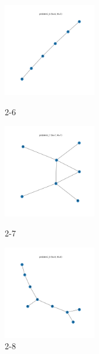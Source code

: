 \documentclass[a4paper, 10pt, dvipdfmx]{jlreq}
\begin{document}
\begin{figure}[htbp]
  \begin{minipage}{0.33\hsize}
    \begin{center}
      \includegraphics[width=40mm]{img_5/problem2_6.png}
    \end{center}
    \caption{2-6}
  \end{minipage}
  \begin{minipage}{0.33\hsize}
    \begin{center}
      \includegraphics[width=40mm]{img_5/problem2_7.png}
    \end{center}
    \caption{2-7}
  \end{minipage}
  \begin{minipage}{0.33\hsize}
    \begin{center}
      \includegraphics[width=40mm]{img_5/problem2_8.png}
    \end{center}
    \caption{2-8}
  \end{minipage}
\end{figure}
\end{document}
